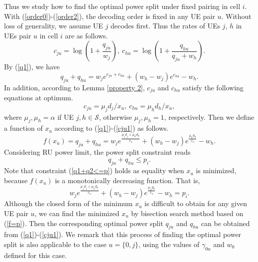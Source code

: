 \documentclass[10pt,journal,final,finalsubmission,twocolumn]{IEEEtran}
\begin{document}
Thus we study how to find the optimal power split under fixed pairing in cell $i$. With (\ref{order0})-(\ref{order2}), the decoding order is fixed in any UE pair $u$. Without loss of generality, we assume UE $j$ decodes first. Thus the rates of UEs $j$, $h$ in UEs pair $u$ in cell $i$ are as follows.
\begin{equation}\label{q1}
c_{ju} = \log(1+\frac{q_{ju}}{w_j}),\ c_{hu} = \log(1+\frac{q_{hu}}{q_{ju}+w_h}).
\end{equation}
By (\ref{q1}), we have 
\begin{equation}
q_{ju} + q_{hu} = w_j e^{c_{ju}+c_{hu}}+(w_h-w_j) e^{c_{hu}}-w_h.
\end{equation}
 In addition, according to Lemma \ref{property 2}, $c_{ju}$ and $c_{hu}$ satisfy the following equations at optimum.
\begin{equation}\label{cju1}
c_{ju} = {\mu_j d_j}/{x_u},\ c_{hu} = {\mu_h d_h}/{x_u},
\end{equation}
where $\mu_j,\mu_h = \alpha$ if UE $j, h\in \mathcal{S}$, otherwise $\mu_j,\mu_h = 1$, respectively. Then we define a function of $x_u$ according to (\ref{q1})-(\ref{cju1}) as follows.
 \begin{equation}
 f(x_u) \!=\! q_{ju}\!+\!q_{hu}\! = \!w_je^{\frac{\mu_j d_j+\mu_h d_h}{x_u}}\!+\!(w_h\!-\!w_j)e^{\frac{\mu_h d_h}{x_u}}\!-\!w_h.\label{q1+q2}
 \end{equation} 
Considering RU power limit, the power split constraint reads
\begin{equation}\label{q1+q2<=p}
q_{ju}+q_{hu} \leq p_i.
\end{equation}
Note that constraint (\ref{q1+q2<=p}) holds as equality when $x_u$ is minimized, because $f(x_u)$ is a monotonically decreasing function. That is,
 \begin{equation}\label{f=p}
w_je^{\frac{\mu_j d_j+\mu_h d_h}{x_u}}+(w_h-w_j)e^{\frac{\mu_h d_h}{x_u}}-w_h= p_i.
 \end{equation}
Although the closed form of the minimum $x_u$ is difficult to obtain for any given UE pair $u$, we can find the minimized $x_u$ by bisection search method based on (\ref{f=p}). Then the corresponding optimal power split $q_{ju}$ and $q_{hu}$ can be obtained from (\ref{q1})-(\ref{cju1}). We remark that this process of finding the optimal power split is also applicable to the case $u=\{0,j\}$, using the values of $\gamma_{0u}$ and $w_0$ defined for this case.
 
\end{document}
